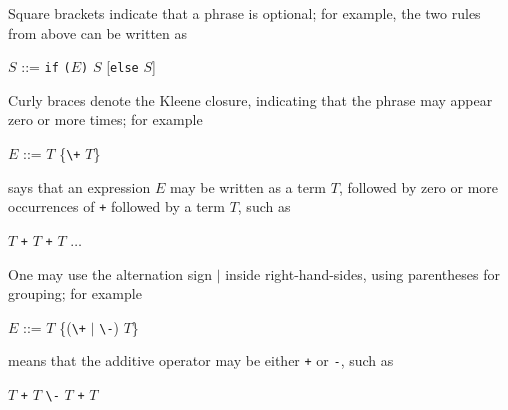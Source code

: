 \documentclass[8pt,a4paper,compress,handout]{beamer}
\newcommand{\mm}[1]{$#1$}
\newenvironment{spaced}
{
\smallskip
\hspace{.5cm}
\begin{minipage}[c]{\textwidth}
}
{
\end{minipage}
\smallskip
}
\begin{document}
\begin{frame}[fragile]
\pause

Square brackets indicate that a phrase is optional; for example, the two rules from above can be written as

\text{ }
\begin{spaced}
\begin{production}
\mm{S} ::=  \lstinline{if} \lstinline{(}\mm{E}\lstinline{)} \mm{S} [\lstinline{else} \mm{S}]
\end{production}
\end{spaced}

\pause
\bigskip

Curly braces denote the Kleene closure, indicating that the phrase may appear zero or more times; for example

\text{ }
\begin{spaced}
\begin{production}
\mm{E} ::= \mm{T} \{\lstinline{\+} \mm{T}\}
\end{production}
\end{spaced}

\noindent says that an expression $E$ may be written as a term $T$, followed by zero or more  occurrences of \lstinline{+} followed by a term $T$, such as

\text{ }
\begin{spaced}
\begin{production}
\mm{T} \lstinline{+} \mm{T} \lstinline{+} \mm{T} \mm{\dots}
\end{production}
\end{spaced}

\pause

One may use the alternation sign $|$ inside right-hand-sides, using parentheses for grouping; for example

\text{ }
\begin{spaced}
\begin{production}
\mm{E} ::= \mm{T} \{(\lstinline{\+} \mm{|} \lstinline{\-}) \mm{T}\}
\end{production}
\end{spaced}

\noindent means that the additive operator may be either \lstinline{+} or \lstinline{-}, such as

\text{ }
\begin{spaced}
\begin{production}
\mm{T} \lstinline{+} \mm{T} \lstinline{\-} \mm{T} \lstinline{+} \mm{T}
\end{production}
\end{spaced}
\end{frame}
\end{document}
